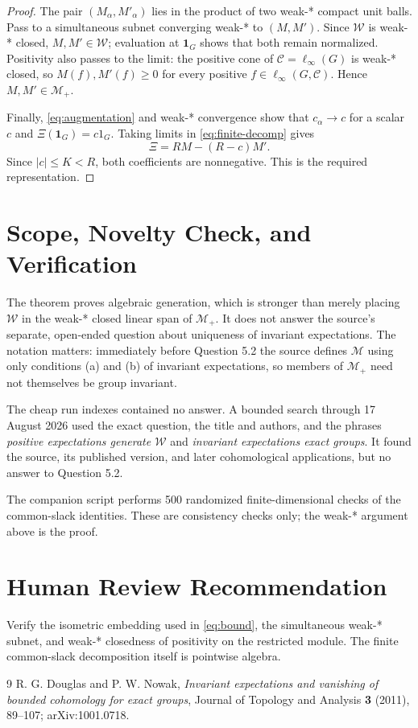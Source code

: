 \documentclass[11pt]{article}
\newcommand{\C}{\mathcal C}
\newcommand{\W}{\mathcal W}
\newcommand{\M}{\mathcal M}
\newcommand{\onefam}{\mathbf 1_G}
\begin{document}
\begin{proof}
The pair $(M_\alpha,M'_\alpha)$ lies in the product of two weak-* compact
unit balls.  Pass to a simultaneous subnet converging weak-* to $(M,M')$.
Since $\W$ is weak-* closed, $M,M'\in\W$; evaluation at
$\onefam$ shows that both remain normalized.  Positivity also passes to
the limit: the positive cone of $\C=\ell_\infty(G)$ is weak-* closed, so
$M(f),M'(f)\geq0$ for every positive
$f\in\ell_\infty(G,\C)$.  Hence $M,M'\in\M_+$.

Finally, \eqref{eq:augmentation} and weak-* convergence show that
$c_\alpha\to c$ for a scalar $c$ and
$\Xi(\onefam)=c1_G$.  Taking limits in
\eqref{eq:finite-decomp} gives
\[
 \Xi=RM-(R-c)M'.
\]
Since $|c|\leq K<R$, both coefficients are nonnegative.  This is the
required representation.
\end{proof}

\section*{Scope, Novelty Check, and Verification}

The theorem proves algebraic generation, which is stronger than merely
placing $\W$ in the weak-* closed linear span of $\M_+$.  It does not answer
the source's separate, open-ended question about uniqueness of invariant
expectations.  The notation matters: immediately before Question 5.2 the
source defines $\M$ using only conditions (a) and (b) of invariant
expectations, so members of $\M_+$ need not themselves be group invariant.

The cheap run indexes contained no answer.  A bounded search through
17 August 2026 used the exact question, the title and authors, and the
phrases \emph{positive expectations generate $\W$} and \emph{invariant
expectations exact groups}.  It found the source, its published version, and
later cohomological applications, but no answer to Question 5.2.

The companion script performs 500 randomized finite-dimensional checks of
the common-slack identities.  These are consistency checks only; the weak-*
argument above is the proof.

\section*{Human Review Recommendation}

Verify the isometric embedding used in \eqref{eq:bound}, the simultaneous
weak-* subnet, and weak-* closedness of positivity on the restricted module.
The finite common-slack decomposition itself is pointwise algebra.

\begin{thebibliography}{9}
\small
{}
R. G. Douglas and P. W. Nowak,
\emph{Invariant expectations and vanishing of bounded cohomology for exact
groups}, Journal of Topology and Analysis \textbf{3} (2011), 89--107;
arXiv:1001.0718.
\end{thebibliography}
\end{document}
